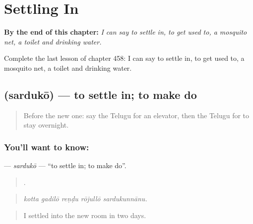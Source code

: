 
\chapter{Settling In}
\label{ch:te-settling-in}

\begin{chapteropening}
\textbf{By the end of this chapter:} \emph{I can say to settle in, to get used to, a mosquito net, a toilet and drinking water.}

Complete the last lesson of chapter 458: I can say to settle in, to get used to, a mosquito net, a toilet and drinking water.
\end{chapteropening}

\section[\texorpdfstring{\te{సర్దుకో} (sardukō)}{సర్దుకో (sardukō)}]{ (sardukō) — to settle in; to make do}

\label{lesson:TE-C458-sarduko}



\begin{quote}
Before the new one: say the Telugu for an elevator, then the Telugu for to stay overnight.
\end{quote}

\subsection*{You'll want to know: }
\textbf{} — \emph{sardukō} — \textquotedblleft{}to settle in; to make do\textquotedblright{}.

\begin{quote}
    .
\end{quote}

\begin{quote}
\emph{kotta gadilō reṇḍu rōjullō sardukunnānu.}
\end{quote}

\begin{quote}
I settled into the new room in two days.
\end{quote}

